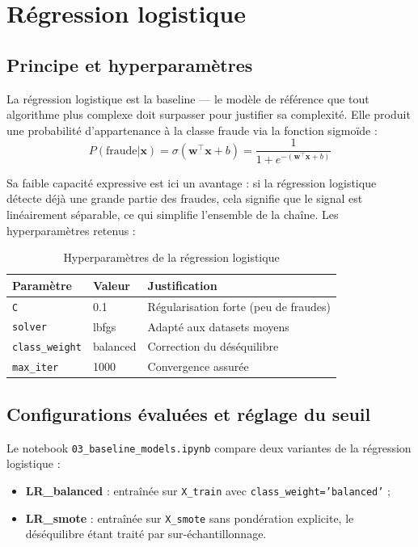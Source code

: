 \documentclass[12pt,a4paper,twoside]{report}
\begin{document}
\section{Régression logistique}

\subsection{Principe et hyperparamètres}

La régression logistique est la baseline --- le modèle de référence que tout algorithme plus complexe doit surpasser pour justifier sa complexité. Elle produit une probabilité d'appartenance à la classe fraude via la fonction sigmoïde :
\[
P(\text{fraude} | \mathbf{x}) = \sigma(\mathbf{w}^\top \mathbf{x} + b) = \frac{1}{1 + e^{-(\mathbf{w}^\top \mathbf{x} + b)}}
\]

Sa faible capacité expressive est ici un avantage : si la régression logistique détecte déjà une grande partie des fraudes, cela signifie que le signal est linéairement séparable, ce qui simplifie l'ensemble de la chaîne. Les hyperparamètres retenus :

\begin{table}[H]
\centering
\caption{Hyperparamètres de la régression logistique}
\label{tab:lr_params}
\begin{tabular}{lll}
\toprule
\textbf{Paramètre} & \textbf{Valeur} & \textbf{Justification} \\
\midrule
\texttt{C}            & 0.1   & Régularisation forte (peu de fraudes) \\
\texttt{solver}       & lbfgs & Adapté aux datasets moyens \\
\texttt{class\_weight}& balanced & Correction du déséquilibre \\
\texttt{max\_iter}    & 1000  & Convergence assurée \\
\bottomrule
\end{tabular}
\end{table}

\subsection{Configurations évaluées et réglage du seuil}

Le notebook \texttt{03\_baseline\_models.ipynb} compare deux variantes de la régression logistique :
\begin{itemize}
  \item \textbf{LR\_balanced} : entraînée sur \texttt{X\_train} avec \texttt{class\_weight='balanced'} ;
  \item \textbf{LR\_smote} : entraînée sur \texttt{X\_smote} sans pondération explicite, le déséquilibre étant traité par sur-échantillonnage.
\end{itemize}
\end{document}
